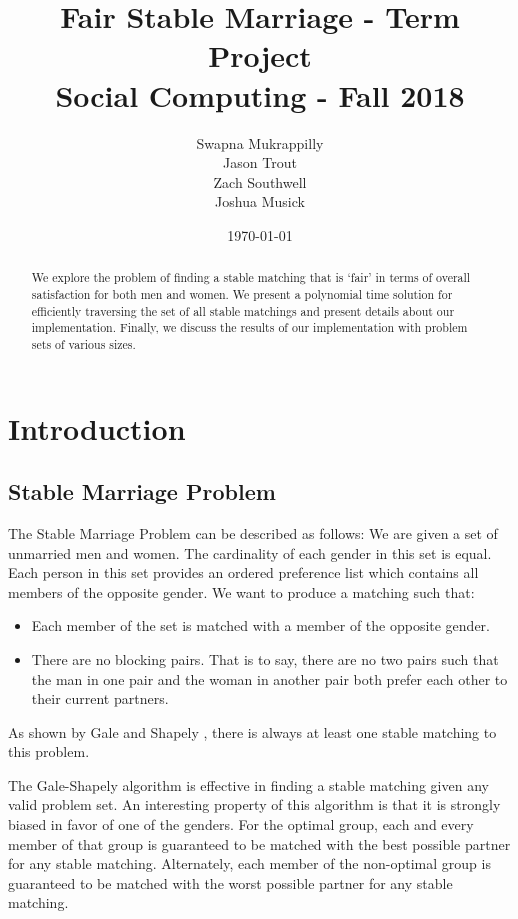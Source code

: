 \documentclass[a4paper]{article}
\title{Fair Stable Marriage - Term Project\\Social Computing - Fall 2018}
\author{Swapna Mukrappilly\\Jason Trout\\Zach Southwell\\Joshua Musick}
\date{\today}
\begin{document}
\maketitle

\begin{abstract}
We explore the problem of finding a stable matching that is `fair' in terms of overall satisfaction for both men and women. We present a polynomial time solution for efficiently traversing the set of all stable matchings and present details about our implementation. Finally, we discuss the results of our implementation with problem sets of various sizes.

\end{abstract}

\section{Introduction}
\label{sec:introduction}

\subsection{Stable Marriage Problem}
The Stable Marriage Problem can be described as follows: We are given a set of unmarried men and women. The cardinality of each gender in this set is equal. Each person in this set provides an ordered preference list which contains all members of the opposite gender. We want to produce a matching such that:
\begin{itemize}
    \item Each member of the set is matched with a member of the opposite gender.
    \item There are no blocking pairs. That is to say, there are no two pairs such that the man in one pair and the woman in another pair both prefer each other to their current partners.
\end{itemize}
As shown by Gale and Shapely \cite{shapely}, there is always at least one stable matching to this problem.

The Gale-Shapely algorithm is effective in finding a stable matching given any valid problem set. An interesting property of this algorithm is that it is strongly biased in favor of one of the genders. For the optimal group, each and every member of that group is guaranteed to be matched with the best possible partner for any stable matching. Alternately, each member of the non-optimal group is guaranteed to be matched with the worst possible partner for any stable matching.
\end{document}
